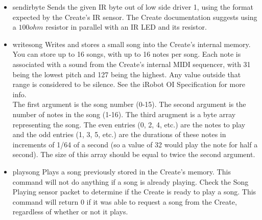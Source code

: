 \documentclass {article}
\begin{document}
\begin {itemize}
  \item {} {sendirbyte}
        Sends the given IR byte out of low side driver 1, using the format expected by the Create's
        IR sensor.  The Create documentation suggests using a $100ohm$ resistor in parallel with an
        IR LED and its resistor. \\
        \retnorm

  \item {} {writesong}
        Writes and stores a small song into the Create's internal memory.  You can store up to 16
        songs, with up to 16 notes per song.  Each note is associated with a sound from the Create's
        internal MIDI sequencer, with 31 being the lowest pitch and 127 being the highest.  Any
        value outside that range is considered to be silence.  See the iRobot OI Specification for
        more info. \\
        The first argument is the song number (0-15).  The second argument is the number of notes in
        the song (1-16).  The third arugment is a byte array representing the song.  The even
        entries (0, 2, 4, etc.) are the notes to play and the odd entries (1, 3, 5, etc.) are the
        durations of these notes in increments of 1/64 of a second (so a value of 32 would play the
        note for half a second).  The size of this array should be equal to twice the second
        argument. \\
        \retnorm

  \item {} {playsong}
        Plays a song previously stored in the Create's memory.  This command will not do anything if
        a song is already playing.  Check the Song Playing sensor packet to determine if the Create
        is ready to play a song.  This command will return 0 if it was able to request a song from
        the Create, regardless of whether or not it plays. \\
        \retnorm


\end{itemize}
\end{document}
